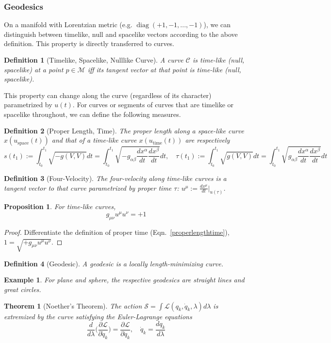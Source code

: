 \documentclass[a4paper]{article}
\DeclareMathOperator{\diag}{diag}
\newtheorem{eg}{Example}[section]
\theoremstyle{new}
\newtheorem{defi}{Definition}[section]
\newtheorem{thm}{Theorem}[section]
\newtheorem{prop}{Proposition}[section]
\begin{document}
\subsubsection{Geodesics}
On a manifold with Lorentzian metric (e.g. $\diag(+1,-1,...,-1)$), we can distinguish between timelike, null and spacelike vectors according to the above definition. This property is directly transferred to curves.
\begin{defi}[Timelike, Spacelike, Nulllike Curve]
A curve $\mathcal{C}$ is time-like (null, spacelike) at a point $p\in\mathcal{M}$ iff its tangent vector at that point is time-like (null, spacelike).
\end{defi}
This property can change along the curve (regardless of its character) parametrized by $u(t)$. For curves or segments of curves that are timelike or spacelike throughout, we can define the following measures.
\begin{defi}[Proper Length, Time]
The proper length along a space-like curve $x(u_{\text{space}}(t))$ and that of a time-like curve $x(u_{\text{time}}(t))$ are respectively
\begin{equation}
s(t_1):=\int_{t_0}^{t_1}\sqrt{-g(V,V)}dt=\int_{t_0}^{t_1}\sqrt{-g_{\alpha\beta}\frac{dx^\alpha}{dt}\frac{dx^\beta}{dt}}dt,\quad \tau(t_1):=\int_{t_0}^{t_1}\sqrt{g(V,V)}dt=\int_{t_0}^{t_1}\sqrt{g_{\alpha\beta}\frac{dx^\alpha}{dt}\frac{dx^\beta}{dt}}dt\label{properlengthtime}
\end{equation}
\end{defi}
\begin{defi}[Four-Velocity]
The four-velocity along time-like curves is a tangent vector to that curve parametrized by proper time $\tau$: $u^\mu:=\frac{dx^\mu}{dt}|_{u(\tau)}$.
\end{defi}
\begin{prop}
For time-like curves,
$$g_{\mu\nu}u^\mu u^\nu=+1$$
\end{prop}
\begin{proof}
Differentiate the definition of proper time (Eqn.~\ref{properlengthtime}), $1=\sqrt{+g_{\mu\nu}u^\mu u^\nu}$.
\end{proof}
\begin{defi}[Geodesic]
A geodesic is a locally length-minimizing curve.
\end{defi}
\begin{eg}
For plane and sphere, the respective geodesics are straight lines and great circles.
\end{eg}
\begin{thm}[Noether's Theorem]
The action $\mathcal{S}=\int\mathcal{L}(q_k,\dot{q}_k,\lambda)d\lambda$ is extremized by the curve satisfying the Euler-Lagrange equations
\begin{equation}
\frac{d}{d\lambda}\bigg(\frac{\partial\mathcal{L}}{\partial\dot{q}_k}\bigg)=\frac{\partial\mathcal{L}}{\partial q_k},\quad\dot{q}_k=\frac{dq_k}{d\lambda}\label{EL}
\end{equation}
\end{thm}
\end{document}
